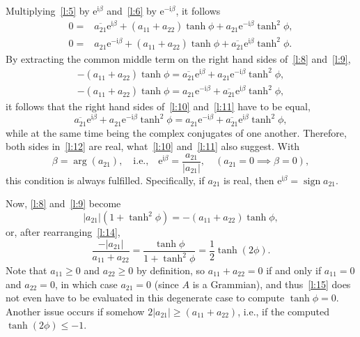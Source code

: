\documentclass[a4paper,12pt,twoside]{article}
\begin{document}
Multiplying~\eqref{l:5} by $\mathrm{e}^{\mathrm{i}\beta}$
and~\eqref{l:6} by $\mathrm{e}^{-\mathrm{i}\beta}$, it follows
\begin{eqnarray}
  0=&\overline{a_{21}^{}}\mathrm{e}^{\mathrm{i}\beta}+(a_{11}^{}+a_{22}^{})\tanh\phi+a_{21}^{}\mathrm{e}^{-\mathrm{i}\beta}\tanh^2\phi,\label{l:8}\\
  0=&a_{21}^{}\mathrm{e}^{-\mathrm{i}\beta}+(a_{11}^{}+a_{22}^{})\tanh\phi+\overline{a_{21}^{}}\mathrm{e}^{\mathrm{i}\beta}\tanh^2\phi.\label{l:9}
\end{eqnarray}
By extracting the common middle term on the right hand sides of~\eqref{l:8} and~\eqref{l:9},
\begin{eqnarray}
  -(a_{11}^{}+a_{22}^{})\tanh\phi=\overline{a_{21}^{}}\mathrm{e}^{\mathrm{i}\beta}+a_{21}^{}\mathrm{e}^{-\mathrm{i}\beta}\tanh^2\phi,\label{l:10}\\
  -(a_{11}^{}+a_{22}^{})\tanh\phi=a_{21}^{}\mathrm{e}^{-\mathrm{i}\beta}+\overline{a_{21}^{}}\mathrm{e}^{\mathrm{i}\beta}\tanh^2\phi,\label{l:11}
\end{eqnarray}
it follows that the right hand sides of~\eqref{l:10} and~\eqref{l:11}
have to be equal,
\begin{equation}
  \overline{a_{21}^{}}\mathrm{e}^{\mathrm{i}\beta}+a_{21}^{}\mathrm{e}^{-\mathrm{i}\beta}\tanh^2\phi=a_{21}^{}\mathrm{e}^{-\mathrm{i}\beta}+\overline{a_{21}^{}}\mathrm{e}^{\mathrm{i}\beta}\tanh^2\phi,
  \label{l:12}
\end{equation}
while at the same time being the complex conjugates of one another.
Therefore, both sides in~\eqref{l:12} are real, what~\eqref{l:10}
and~\eqref{l:11} also suggest.  With
\begin{equation}
  \beta=\arg(a_{21}),\quad\text{i.e.,}\quad\mathrm{e}^{\mathrm{i}\beta}=\frac{a_{21}}{|a_{21}|},\quad(a_{21}=0\implies\beta=0),
  \label{l:13}
\end{equation}
this condition is always fulfilled.  Specifically, if $a_{21}$ is
real, then $\mathrm{e}^{\mathrm{i}\beta}=\mathop{\mathrm{sign}}{a_{21}}$.

Now, \eqref{l:8} and~\eqref{l:9} become
\begin{equation}
  |a_{21}|(1+\tanh^2\phi)=-(a_{11}+a_{22})\tanh\phi,
  \label{l:14}
\end{equation}
or, after rearranging~\eqref{l:14},
\begin{equation}
  \frac{-|a_{21}|}{a_{11}+a_{22}}=\frac{\tanh\phi}{1+\tanh^2\phi}=\frac{1}{2}\tanh(2\phi).
  \label{l:15}
\end{equation}
Note that $a_{11}\ge 0$ and $a_{22}\ge 0$ by definition, so
$a_{11}+a_{22}=0$ if and only if $a_{11}=0$ and $a_{22}=0$, in which
case $a_{21}=0$ (since $A$ is a Grammian), and thus~\eqref{l:15} does
not even have to be evaluated in this degenerate case to compute
$\tanh\phi=0$.  Another issue occurs if somehow
$2|a_{21}|\ge(a_{11}+a_{22})$, i.e., if the computed
$\tanh(2\phi)\le-1$.
\end{document}
